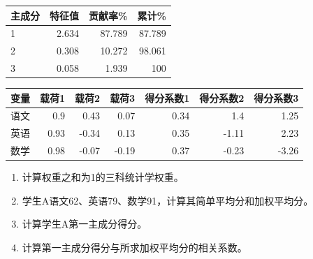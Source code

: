 \begin{center}\small\setlength{\tabcolsep}{4pt}\renewcommand{\arraystretch}{1.18}\begin{tabular}{@{}lrrr@{}}
\toprule
主成分 & 特征值 & 贡献率\% & 累计\% \\
\midrule

1 & 2.634 & 87.789 & 87.789 \\
2 & 0.308 & 10.272 & 98.061 \\
3 & 0.058 & 1.939 & 100 \\
\bottomrule\end{tabular}\end{center}

\begin{center}\small\setlength{\tabcolsep}{4pt}\renewcommand{\arraystretch}{1.18}\begin{tabular}{@{}lrrrrrr@{}}
\toprule
变量 & 载荷1 & 载荷2 & 载荷3 & 得分系数1 & 得分系数2 & 得分系数3 \\
\midrule

语文 & 0.9 & 0.43 & 0.07 & 0.34 & 1.4 & 1.25 \\
英语 & 0.93 & -0.34 & 0.13 & 0.35 & -1.11 & 2.23 \\
数学 & 0.98 & -0.07 & -0.19 & 0.37 & -0.23 & -3.26 \\
\bottomrule\end{tabular}\end{center}

\begin{enumerate}
\def\labelenumi{\arabic{enumi}.}
\tightlist
\item
  计算权重之和为1的三科统计学权重。
\item
  学生A语文62、英语79、数学91，计算其简单平均分和加权平均分。
\item
  计算学生A第一主成分得分。
\item
  计算第一主成分得分与所求加权平均分的相关系数。
\end{enumerate}



